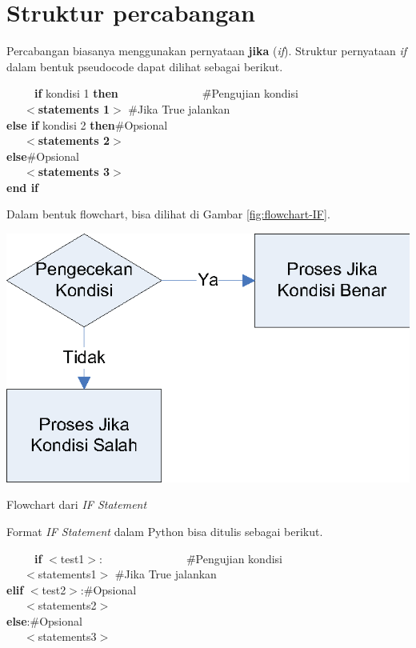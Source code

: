 \section{Struktur percabangan}
Percabangan biasanya menggunakan pernyataan \textbf{jika} (\textit{if}). Struktur pernyataan \textit{if} dalam bentuk pseudocode dapat dilihat sebagai berikut.

\begin{tabbing}
~~~~~\=\textbf{if} kondisi 1 \textbf{then}~~~~~~~~~~~~~~~\=\#Pengujian kondisi\\
\>~~~$<$\textbf{statements 1}$>$ \> \#Jika True jalankan\\
\>\textbf{else if } kondisi 2 \textbf{then}\>\#Opsional\\
\>~~~$<$\textbf{statements 2}$>$\>\\
\>\textbf{else}\>\#Opsional\\
\>~~~$<$\textbf{statements 3}$>$\>\\
\>\textbf{end if}
\end{tabbing}


Dalam bentuk flowchart, bisa dilihat di Gambar \ref{fig:flowchart-IF}.

\begin{marginfigure}%
\includegraphics[scale=0.6]{fig/flowchart-IF.eps}%
\caption{Flowchart dari \textit{IF Statement}}%
\label{fig:flowchart-IF}%
\end{marginfigure}

Format \textit{IF Statement} dalam Python bisa ditulis sebagai berikut.

\begin{tabbing}
~~~~~\=\textbf{if} $<$test1$>$:~~~~~~~~~~~~~~~\=\#Pengujian kondisi\\
\>~~~$<$statements1$>$ \> \#Jika True jalankan\\
\>\textbf{elif} $<$test2$>$:\>\#Opsional\\
\>~~~$<$statements2$>$\>\\
\>\textbf{else}:\>\#Opsional\\
\>~~~$<$statements3$>$\>\\
\end{tabbing}


